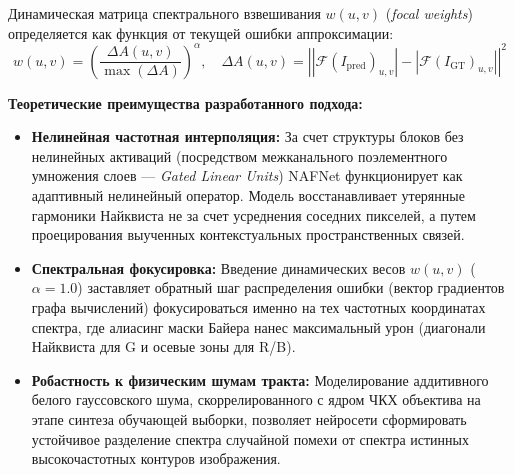 \documentclass[12pt,a4paper]{article}
\begin{document}
Динамическая матрица спектрального взвешивания $w(u,v)$ (\textit{focal weights}) определяется как функция от текущей ошибки аппроксимации:
\begin{equation}
w(u,v) = \left( \frac{\Delta A(u,v)}{\max(\Delta A)} \right)^\alpha, \quad \Delta A(u,v) = \left| \left| \mathcal{F}(I_{\text{pred}})_{u,v} \right| - \left| \mathcal{F}(I_{\text{GT}})_{u,v} \right| \right|^2
\end{equation}

\textbf{Теоретические преимущества разработанного подхода:}
\begin{itemize}
    \item \textbf{Нелинейная частотная интерполяция:} За счет структуры блоков без нелинейных активаций (посредством межканального поэлементного умножения слоев --- \textit{Gated Linear Units}) NAFNet функционирует как адаптивный нелинейный оператор. Модель восстанавливает утерянные гармоники Найквиста не за счет усреднения соседних пикселей, а путем проецирования выученных контекстуальных пространственных связей.
    \item \textbf{Спектральная фокусировка:} Введение динамических весов $w(u,v)$ ($\alpha = 1.0$) заставляет обратный шаг распределения ошибки (вектор градиентов графа вычислений) фокусироваться именно на тех частотных координатах спектра, где алиасинг маски Байера нанес максимальный урон (диагонали Найквиста для G и осевые зоны для R/B).
    \item \textbf{Робастность к физическим шумам тракта:} Моделирование аддитивного белого гауссовского шума, скоррелированного с ядром ЧКХ объектива на этапе синтеза обучающей выборки, позволяет нейросети сформировать устойчивое разделение спектра случайной помехи от спектра истинных высокочастотных контуров изображения.
\end{itemize}
\end{document}
